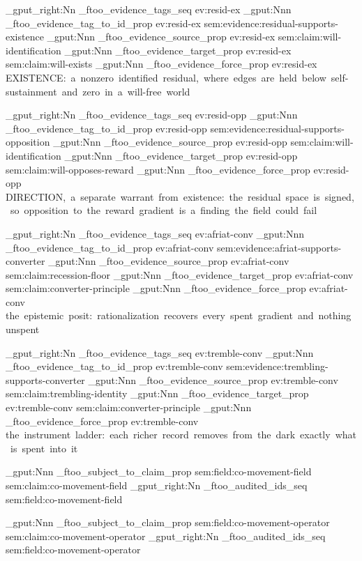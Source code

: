 \seq_gput_right:Nn \g_ftoo_evidence_tags_seq { ev:resid-ex }
\prop_gput:Nnn \g_ftoo_evidence_tag_to_id_prop { ev:resid-ex } { sem:evidence:residual-supports-existence }
\prop_gput:Nnn \g_ftoo_evidence_source_prop { ev:resid-ex } { sem:claim:will-identification }
\prop_gput:Nnn \g_ftoo_evidence_target_prop { ev:resid-ex } { sem:claim:will-exists }
\prop_gput:Nnn \g_ftoo_evidence_force_prop { ev:resid-ex } { EXISTENCE:~a~nonzero~identified~residual,~where~edges~are~held~below~self-sustainment~and~zero~in~a~will-free~world }

\seq_gput_right:Nn \g_ftoo_evidence_tags_seq { ev:resid-opp }
\prop_gput:Nnn \g_ftoo_evidence_tag_to_id_prop { ev:resid-opp } { sem:evidence:residual-supports-opposition }
\prop_gput:Nnn \g_ftoo_evidence_source_prop { ev:resid-opp } { sem:claim:will-identification }
\prop_gput:Nnn \g_ftoo_evidence_target_prop { ev:resid-opp } { sem:claim:will-opposes-reward }
\prop_gput:Nnn \g_ftoo_evidence_force_prop { ev:resid-opp } { DIRECTION,~a~separate~warrant~from~existence:~the~residual~space~is~signed,~so~opposition~to~the~reward~gradient~is~a~finding~the~field~could~fail }

\seq_gput_right:Nn \g_ftoo_evidence_tags_seq { ev:afriat-conv }
\prop_gput:Nnn \g_ftoo_evidence_tag_to_id_prop { ev:afriat-conv } { sem:evidence:afriat-supports-converter }
\prop_gput:Nnn \g_ftoo_evidence_source_prop { ev:afriat-conv } { sem:claim:recession-floor }
\prop_gput:Nnn \g_ftoo_evidence_target_prop { ev:afriat-conv } { sem:claim:converter-principle }
\prop_gput:Nnn \g_ftoo_evidence_force_prop { ev:afriat-conv } { the~epistemic~posit:~rationalization~recovers~every~spent~gradient~and~nothing~unspent }

\seq_gput_right:Nn \g_ftoo_evidence_tags_seq { ev:tremble-conv }
\prop_gput:Nnn \g_ftoo_evidence_tag_to_id_prop { ev:tremble-conv } { sem:evidence:trembling-supports-converter }
\prop_gput:Nnn \g_ftoo_evidence_source_prop { ev:tremble-conv } { sem:claim:trembling-identity }
\prop_gput:Nnn \g_ftoo_evidence_target_prop { ev:tremble-conv } { sem:claim:converter-principle }
\prop_gput:Nnn \g_ftoo_evidence_force_prop { ev:tremble-conv } { the~instrument~ladder:~each~richer~record~removes~from~the~dark~exactly~what~is~spent~into~it }



\prop_gput:Nnn \g_ftoo_subject_to_claim_prop { sem:field:co-movement-field } { sem:claim:co-movement-field }
\seq_gput_right:Nn \g_ftoo_audited_ids_seq { sem:field:co-movement-field }

\prop_gput:Nnn \g_ftoo_subject_to_claim_prop { sem:field:co-movement-operator } { sem:claim:co-movement-operator }
\seq_gput_right:Nn \g_ftoo_audited_ids_seq { sem:field:co-movement-operator }

